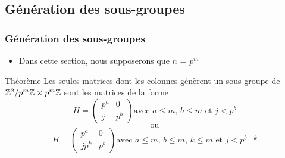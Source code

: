 \documentclass[10pt]{beamer}
\newcommand*{\pmZpmZ }{p^m\Z \x p^m\Z}
\newcommand*{\ZZpmZ}{\Z^2/\pmZpmZ}
\begin{document}
\subsection{Génération des sous-groupes}
\begin{frame}
    \frametitle{Génération des sous-groupes}
    \begin{itemize}
        \item Dans cette section, nous supposerons que $n$ = ${p}^{m}$
    \end{itemize}
    \begin{alertblock}{Théorème}
        Les seules matrices dont les colonnes génèrent un sous-groupe de $\ZZpmZ$
        sont les matrices de la forme
        $$H =
            \begin{pmatrix}
                p^a & 0   \\
                j   & p^b
            \end{pmatrix}
            \text{avec $a \le m$, $b \le m$ et $j < p^b$}
        $$
        $$ \text{ ou }$$
        $$ H =\begin{pmatrix}
                p^a  & 0   \\
                jp^k & p^b
            \end{pmatrix}
            \text{avec $a \le m$, $b \le m$, $k \le m$ et $j < p^{b - k}$}
        $$
    \end{alertblock}
\end{frame}
\end{document}
